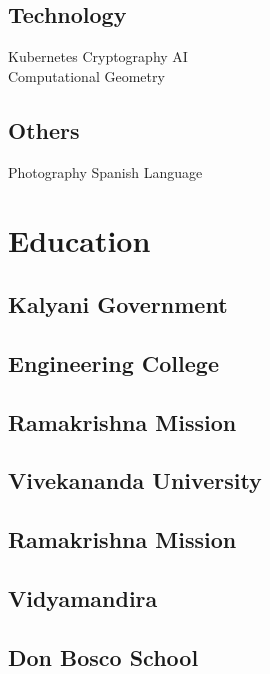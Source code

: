 \documentclass[]{deedy-resume-openfont}
\begin{document}
\begin{minipage}[t]{0.33\textwidth}
\subsection{Technology}
Kubernetes  \textbullet{} Cryptography  \textbullet{} AI \\
 \textbullet{} Computational Geometry
\subsection{Others}
Photography  \textbullet{} Spanish Language


\vskip 3cm
\section{Education}

\subsection{Kalyani Government}
\subsection{Engineering College}
\sectionsep

\subsection{Ramakrishna Mission}
\subsection{Vivekananda University}
\sectionsep

\subsection{Ramakrishna Mission}
\subsection{Vidyamandira}
\sectionsep

\subsection{Don Bosco School}
\sectionsep


%
%

\end{minipage}
\end{document}
